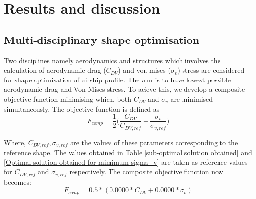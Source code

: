 \chapter{Results and discussion}
\label{Final results}

\section{Multi-disciplinary shape optimisation}
Two disciplines namely aerodynamics and structures which involves the calculation of aerodynamic drag ($ C_{DV} $) and von-mises ($ \sigma _{v} $) stress are considered for shape optimisation of airship profile. The aim is to have lowest possible aerodynamic drag and Von-Mises stress. To acieve this, we develop a composite objective function minimising which, both $ C_{DV} $ and $ \sigma _{v} $ are minimised simultaneously.
The objective function is defined as
\begin{equation}
F_{comp} = \frac{1}{2}\bigg( \frac{C_{DV}}{C_{DV,ref}} + \dfrac{\sigma _{v}}{\sigma _{v,ref}} \bigg)
\end{equation}

Where, $C_{DV,ref} , \sigma _{v,ref}  $ are the values of these parameters corresponding to the reference shape.  The values obtained in Table \ref{sub-optimal solution obtained} and \ref{Optimal solution obtained for mimimum sigma_v} are taken as reference values for $C_{DV,ref}$ and $\sigma _{v,ref}  $ respectively. The composite objective function now becomes:
\begin{equation}
F_{comp} = 0.5*(0.0000* C_{DV} + 0.0000 * \sigma _{v})
\end{equation}
